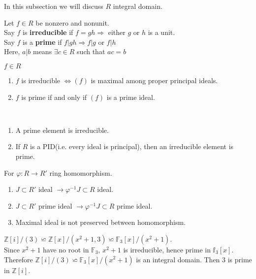 In this subsection we will discuss  $ R  $ integral domain.
\begin{definition}
    Let  $ f\in R  $ be nonzero and nonunit.\\ Say  $ f  $ is \textbf{irreducible} if  $ f=gh \Rightarrow  $ either $ g $  or  $ h  $ is a unit.\\Say  $ f  $ is a \textbf{prime } if  $ f|gh \Rightarrow f|g  $ or  $ f|h  $\\
    Here,  $ a|b  $ means $ \exists c\in R  $ such that  $ ac=b  $  
\end{definition}
\begin{proposition}
     $ f\in R  $ 
     \begin{enumerate}
        \item  $ f  $ is irreducible $ \Leftrightarrow (f)  $ is maximal among proper principal ideals.
        \item  $ f  $ is prime if and only if  $ (f)  $ is a prime ideal.
     \end{enumerate}
\end{proposition}
\begin{proposition}\,
    \begin{enumerate}
        \item A prime element is irreducible.
        \item If  $ R  $ is a PID(i.e. every ideal is principal), then an irreducible element is prime.
    \end{enumerate}
\end{proposition}
\begin{proposition}
    For  $ \varphi:R\rightarrow R'  $ ring homomorphism.
    \begin{enumerate}
        \item  $ J\subset R'  $ ideal  $ \rightarrow \varphi^{-1}J\subset R $ ideal.
        \item  $ J\subset R'  $ prime ideal  $ \rightarrow \varphi^{-1}J\subset R $ prime ideal.
        \item Maximal ideal is not preserved between homomorphism.
    \end{enumerate}
\end{proposition}
\begin{example}
     $ \mathbb{Z }[i]/(3)\backsimeq \mathbb{Z}[x]/(x^2+1,3)\backsimeq \mathbb{F}_3[x]/(x^2+1) $.\\
     Since  $ x^2+1 $ have no root in  $ \mathbb{F}_3  $,   $ x^2+1  $ is irreducible, hence prime in  $ \mathbb{f}_3[x] $. Therefore  $ \mathbb{Z}[i]/(3)\backsimeq \mathbb{F}_3[x]/(x^2+1) $ is an integral domain. Then  $ 3  $ is prime in  $ \mathbb{Z}[i] $.  
\end{example}
